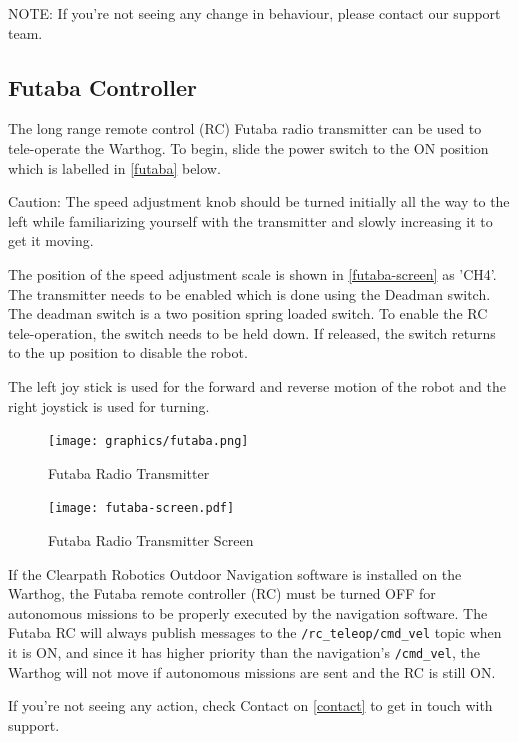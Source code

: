 \documentclass[]{clearpath-latex/clearpath-manual}
\begin{document}
NOTE: If you’re not seeing any change in behaviour, please contact our support team.

\pagebreak[4]

\subsection{Futaba Controller}

The long range remote control (RC) Futaba radio transmitter can be used to tele-operate the Warthog.
To begin, slide the power switch to the ON position which is labelled in
\autoref{futaba} below.

\begin{warning}[]
Caution: The speed adjustment knob should be turned initially all the way to the left while familiarizing yourself with the transmitter and slowly increasing it to get it moving.
\end{warning}

The position of the speed adjustment scale is shown in \autoref{futaba-screen} as 'CH4'.
The transmitter needs to be enabled which is done using the Deadman switch.  The deadman switch is a two position spring loaded switch.  To enable the RC tele-operation, the switch needs to be held down.  If released, the switch returns to the up position to disable the robot.

The left joy stick is used for the forward and reverse motion of the robot and the right joystick is used for turning.

\begin{figure}[!h]
  \centering
  \texttt{[image: graphics/futaba.png]}
  \caption{Futaba Radio Transmitter}
  \label{futaba}
\end{figure}

\begin{figure}[!h]
  \centering
  \texttt{[image: futaba-screen.pdf]}
  \caption{Futaba Radio Transmitter Screen}
  \label{futaba-screen}
\end{figure}


If the Clearpath Robotics Outdoor Navigation software is installed on the Warthog, the Futaba remote controller (RC) must be turned OFF for autonomous missions to be properly executed by the navigation software.
The Futaba RC will always publish messages to the \lstinline!/rc_teleop/cmd_vel! topic when it is ON, and since it has higher priority than the navigation's \lstinline!/cmd_vel!, the Warthog will not move if autonomous missions are sent and the RC is still ON.

If you’re not seeing any action, check Contact on \autoref{contact} to get in touch with support.
\end{document}
